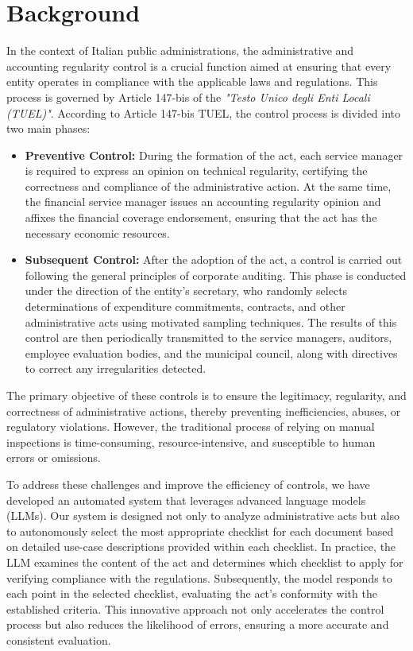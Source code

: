 \documentclass[../main.tex]{subfiles}
\begin{document}
\section*{Background}
In the context of Italian public administrations, the administrative and accounting regularity control is a crucial function aimed at ensuring that every entity operates in compliance with the applicable laws and regulations. This process is governed by Article 147-bis of the \textit{"Testo Unico degli Enti Locali (TUEL)"}. According to Article 147-bis TUEL, the control process is divided into two main phases:

\begin{itemize}
    \item \textbf{Preventive Control:} During the formation of the act, each service manager is required to express an opinion on technical regularity, certifying the correctness and compliance of the administrative action. At the same time, the financial service manager issues an accounting regularity opinion and affixes the financial coverage endorsement, ensuring that the act has the necessary economic resources.
    \item \textbf{Subsequent Control:} After the adoption of the act, a control is carried out following the general principles of corporate auditing. This phase is conducted under the direction of the entity's secretary, who randomly selects determinations of expenditure commitments, contracts, and other administrative acts using motivated sampling techniques. The results of this control are then periodically transmitted to the service managers, auditors, employee evaluation bodies, and the municipal council, along with directives to correct any irregularities detected.
\end{itemize}

The primary objective of these controls is to ensure the legitimacy, regularity, and correctness of administrative actions, thereby preventing inefficiencies, abuses, or regulatory violations. However, the traditional process of relying on manual inspections is time-consuming, resource-intensive, and susceptible to human errors or omissions.

To address these challenges and improve the efficiency of controls, we have developed an automated system that leverages advanced language models (LLMs). Our system is designed not only to analyze administrative acts but also to autonomously select the most appropriate checklist for each document based on detailed use-case descriptions provided within each checklist. In practice, the LLM examines the content of the act and determines which checklist to apply for verifying compliance with the regulations. Subsequently, the model responds to each point in the selected checklist, evaluating the act's conformity with the established criteria. This innovative approach not only accelerates the control process but also reduces the likelihood of errors, ensuring a more accurate and consistent evaluation.
\end{document}
